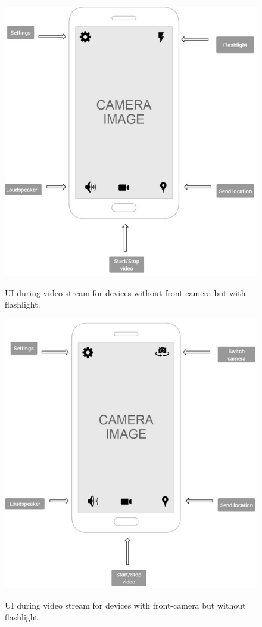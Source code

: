 \documentclass{article}
\begin{document}
    
	
	\begin{figure}[h]
		\centering
		\includegraphics[width=.9\textwidth]{"VideoStream/12"}

		UI during video stream for devices without front-camera but with flashlight.
	\end{figure} \clearpage
    
    
	
	\begin{figure}[h]
		\centering
		\includegraphics[width=.9\textwidth]{"VideoStream/13"}

		UI during video stream for devices with front-camera but without flashlight.
	\end{figure} \clearpage
    
\end{document}
